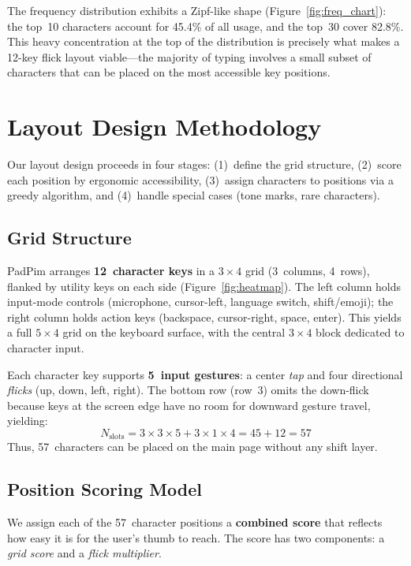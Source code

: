 \documentclass[10pt,twocolumn,a4paper]{article}
\begin{document}
The frequency distribution exhibits a Zipf-like shape (Figure~\ref{fig:freq_chart}): the top~10 characters account for 45.4\% of all usage, and the top~30 cover 82.8\%.
This heavy concentration at the top of the distribution is precisely what makes a 12-key flick layout viable---the majority of typing involves a small subset of characters that can be placed on the most accessible key positions.

\section{Layout Design Methodology}
\label{sec:design}

Our layout design proceeds in four stages: (1)~define the grid structure, (2)~score each position by ergonomic accessibility, (3)~assign characters to positions via a greedy algorithm, and (4)~handle special cases (tone marks, rare characters).

\subsection{Grid Structure}
\label{sec:design_grid}

PadPim arranges \textbf{12~character keys} in a $3 \times 4$ grid (3~columns, 4~rows), flanked by utility keys on each side (Figure~\ref{fig:heatmap}).
The left column holds input-mode controls (microphone, cursor-left, language switch, shift/emoji); the right column holds action keys (backspace, cursor-right, space, enter).
This yields a full $5 \times 4$ grid on the keyboard surface, with the central $3 \times 4$ block dedicated to character input.

Each character key supports \textbf{5~input gestures}: a center \emph{tap} and four directional \emph{flicks} (up, down, left, right).
The bottom row (row~3) omits the down-flick because keys at the screen edge have no room for downward gesture travel, yielding:
$$
N_{\text{slots}} = 3 \times 3 \times 5 + 3 \times 1 \times 4 = 45 + 12 = 57
$$
Thus, 57~characters can be placed on the main page without any shift layer.

\subsection{Position Scoring Model}
\label{sec:design_scoring}

We assign each of the 57~character positions a \textbf{combined score} that reflects how easy it is for the user's thumb to reach.
The score has two components: a \emph{grid score} and a \emph{flick multiplier}.
\end{document}
